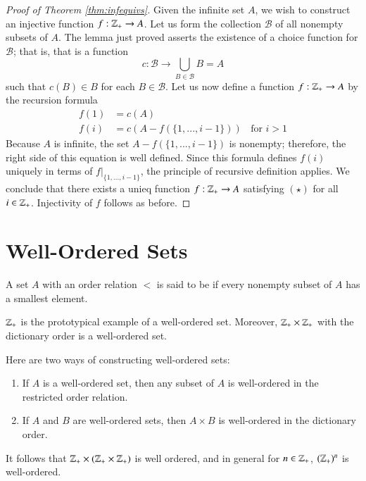     \begin{proof}[Proof of Theorem \ref{thm:infequivs}]
        Given the infinite set $A$, we wish to construct an injective function $f:\mathbb Z_+\rightarrow A$. Let us form the collection $\mathscr{B}$ of all nonempty subsets of $A$. The lemma just proved asserts the existence of a choice function for $\mathscr{B}$; that is, that is a function \begin{equation*}
            c:\mathscr{B}\rightarrow \bigcup\limits_{B\in\mathscr{B}}B = A
        \end{equation*}
        such that $c(B) \in B$ for each $B \in \mathscr{B}$. Let us now define a function $f:\mathbb Z_+\rightarrow A$ by the recursion formula \begin{align*}
            f(1) &= c(A) \\
            f(i) &= c(A-f(\{1,...,i-1\}))\;\;\text{ for } i >1
        \end{align*}
        Because $A$ is infinite, the set $A-f(\{1,...,i-1\})$ is nonempty; therefore, the right side of this equation is well defined. Since this formula defines $f(i)$ uniquely in terms of $f\rvert_{\{1,...,i-1\}}$, the principle of recursive definition applies. We conclude that there exists a unieq function $f:\mathbb Z_+\rightarrow A$ satisfying $(\star)$ for all $i \in \mathbb Z_+$. Injectivity of $f$ follows as before.
    \end{proof}



    \section{Well-Ordered Sets}

    
    \begin{definition}
        A set $A$ with an order relation $<$ is said to be  if every nonempty subset of $A$ has a smallest element.
    \end{definition}

    \begin{example}
        $\mathbb Z_+$ is the prototypical example of a well-ordered set. Moreover, $\mathbb Z_+\times \mathbb Z_+$ with the dictionary order is a well-ordered set.
    \end{example}

    \begin{remark}
        Here are two ways of constructing well-ordered sets:\begin{enumerate}
            \item If $A$ is a well-ordered set, then any subset of $A$ is well-ordered in the restricted order relation.
            \item If $A$ and $B$ are well-ordered sets, then $A\times B$ is well-ordered in the dictionary order.
        \end{enumerate}
        It follows that $\mathbb Z_+\times(\mathbb Z_+\times \mathbb Z_+)$ is well ordered, and in general for $n \in \mathbb Z_+$, $(\mathbb Z_+)^n$ is well-ordered.
    \end{remark}

